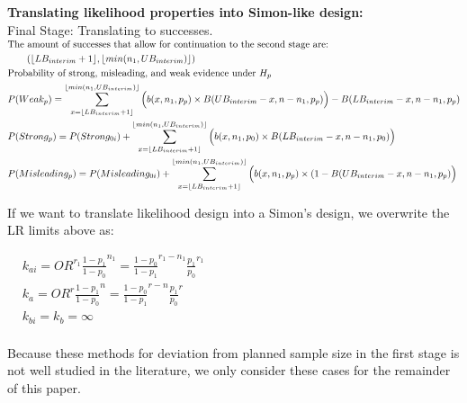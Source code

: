 \documentclass[12pt]{report}\usepackage[]{graphicx}\usepackage[]{color}
\DeclarePairedDelimiter\floor{\lfloor}{\rfloor}
\newlength{\li}\setlength{\li}{14.48pt}
\newlength{\di}\setlength{\di}{-3.5mm}
\begin{document}
  \newpage 
\vspace{5mm}
\noindent \textbf{Translating likelihood properties into Simon-like design:} \\
Final Stage: Translating to successes.\\
$\begin{aligned}
& \text{The amount of successes that allow for continuation to the second stage are:  }  \\                   
& \qquad  (\floor*{LB_{interim}+1}, \floor*{min(n_1, UB_{interim})}) \\
&\text{Probability of strong, misleading, and weak evidence under } H_p \\
& P(Weak_p) = \sum_{x=\floor*{LB_{interim}+1}}^{\floor*{min(n_1, UB_{interim})}} \Big(b(x, n_1, p_p) \times B(UB_{interim} - x, n - n_1, p_p)\Big) - B(LB_{interim} - x, n - n_1, p_p)\\
& P(Strong_p) = P(Strong_{0i}) + \sum_{x=\floor*{LB_{interim}+1}}^{\floor*{min(n_1, UB_{interim})}} \Big( b(x,n_1,p_0) \times B(LB_{interim} - x, n-n_1, p_0) \Big) \\
& P(Misleading_p) = P(Misleading_{0i}) + \sum_{x=\floor*{LB_{interim}+1}}^{\floor*{min(n_1, UB_{interim})}} \Big(b(x, n_1, p_p) \times (1-B(UB_{interim} - x, n-n_1, p_p) \Big)
\end{aligned}$


\vspace{10mm}
\noindent If we want to translate likelihood design into a Simon's design, we overwrite the LR limits above as:

$\begin{aligned}
 &k_{ai} = OR^{r_1} \frac{1-p_1}{1-p_0}^{n_1} = \frac{1-p_0}{1-p_1}^{r_1-n_1}\frac{p_1}{p_0}^{r_1} \\
 &k_a  = OR^{r} \frac{1-p_1}{1-p_0}^{n} = \frac{1-p_0}{1-p_1}^{r-n}\frac{p_1}{p_0}^{r}\\
 &k_{bi} = k_b = \infty\\
\end{aligned}$

Because these methods for deviation from planned sample size in the first stage is not well studied in the literature, we only consider these cases for the remainder of this paper. 
\end{document}
